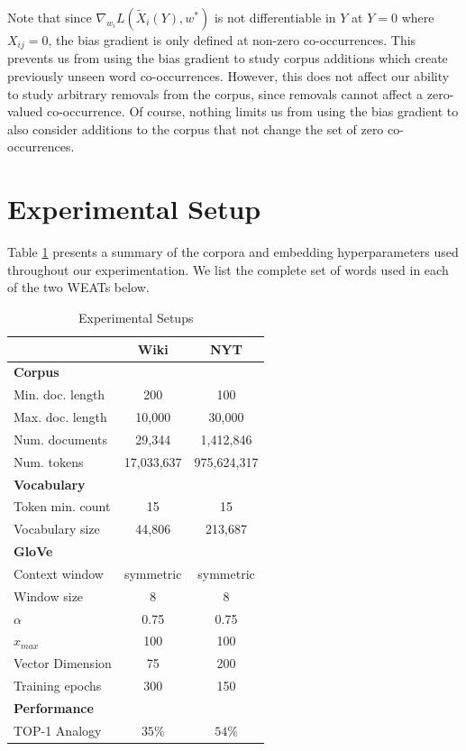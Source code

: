 \documentclass{article}
\begin{document}
Note that since $\nabla_{w_i} L(\tilde{X}_i(Y), w^*)$ is not differentiable in $Y$ at $Y=0$ where $X_{ij}=0$, the bias gradient is only defined at non-zero co-occurrences.
This prevents us from using the bias gradient to study corpus additions which create previously unseen word co-occurrences.
However, this does not affect our ability to study arbitrary removals from the corpus, since removals cannot affect a zero-valued co-occurrence.
Of course, nothing limits us from using the bias gradient to also consider additions to the corpus that not change the set of zero co-occurrences.

\section{Experimental Setup}
Table \ref{tab:setup} presents a summary of the corpora and embedding hyperparameters used throughout our experimentation.
We list the complete set of words used in each of the two WEATs below.

\begin{table}[hb]
\caption{Experimental Setups}
\label{tab:setup}
\begin{center}
\begin{tabular}{ l  c  c }
\toprule
                 & \textbf{Wiki}        &  \textbf{NYT} \\ \midrule
\textbf{Corpus} \\
Min. doc. length & 200         & 100 \\
Max. doc. length & 10,000      & 30,000 \\
Num. documents   & 29,344      & 1,412,846 \\
Num. tokens      & 17,033,637  & 975,624,317 \\
\midrule
\textbf{Vocabulary} \\
Token min. count & 15          & 15 \\
Vocabulary size  & 44,806      & 213,687 \\
\midrule
\textbf{GloVe} \\
Context window   & symmetric   & symmetric \\
Window size      & 8           & 8 \\
$\alpha$         & 0.75        & 0.75 \\
$x_{max}$        & 100         & 100 \\
Vector Dimension & 75          & 200 \\
Training epochs  & 300         & 150 \\
\midrule
\textbf{Performance} \\
TOP-1 Analogy    & $35$\%     & $54$\%
\end{tabular}
\end{center}
\end{table}
\end{document}
